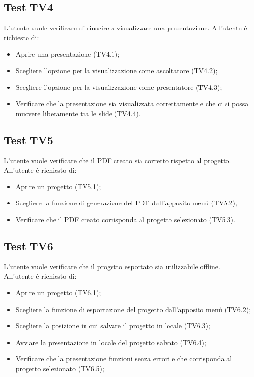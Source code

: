 \subsection{Test TV4}
L'utente vuole verificare di riuscire a visualizzare una presentazione. \newline
All'utente \'e richiesto di:
\begin{itemize}
	\item Aprire una presentazione (TV4.1);
	\item Scegliere l'opzione per la visualizzazione come ascoltatore (TV4.2);
	\item Scegliere l'opzione per la visualizzazione come presentatore (TV4.3);
	\item Verificare che la presentazione sia visualizzata correttamente e che ci si possa muovere liberamente tra le slide (TV4.4).
\end{itemize}

\subsection{Test TV5}
L'utente vuole verificare che il PDF creato sia corretto rispetto al progetto. \newline
All'utente \'e richiesto di:
\begin{itemize}
	\item Aprire un progetto (TV5.1);
	\item Scegliere la funzione di generazione del PDF dall'apposito men\'u (TV5.2);
	\item Verificare che il PDF creato corrisponda al progetto selezionato (TV5.3).
\end{itemize}

\subsection{Test TV6}
L'utente vuole verificare che il progetto esportato sia utilizzabile offline. \newline
All'utente \'e richiesto di:
\begin{itemize}
	\item Aprire un progetto (TV6.1);
	\item Scegliere la funzione di esportazione del progetto dall'apposito men\'u (TV6.2);
	\item Scegliere la posizione in cui salvare il progetto in locale (TV6.3);
	\item Avviare la presentazione in locale del progetto salvato (TV6.4);
	\item Verificare che la presentazione funzioni senza errori e che corrisponda al progetto selezionato (TV6.5);
\end{itemize}

